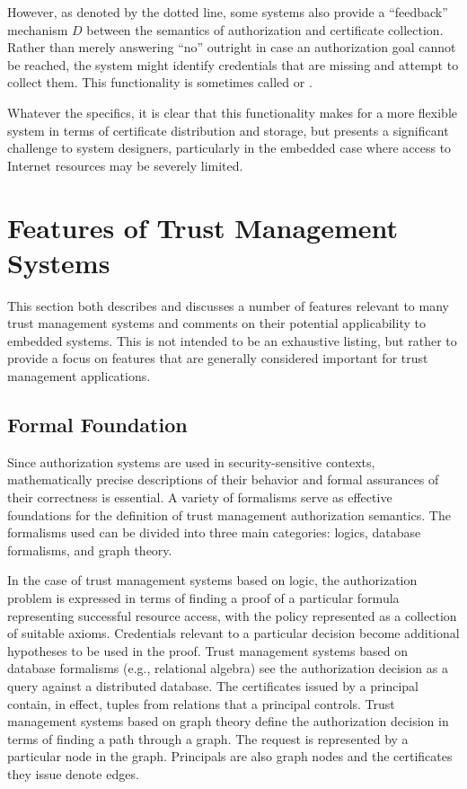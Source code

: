 However, as denoted by the dotted line, some systems also provide a ``feedback'' mechanism $D$
between the semantics of authorization and certificate collection. Rather than merely answering
``no'' outright in case an authorization goal cannot be reached, the system might identify
credentials that are missing and attempt to collect them. This functionality is sometimes called
 \cite{Li:DCDTM} or  \cite{Gunter:PDCR}.

Whatever the specifics, it is clear that this functionality makes for a more flexible system in
terms of certificate distribution and storage, but presents a significant challenge to system
designers, particularly in the embedded case where access to Internet resources may be severely
limited.

\section{Features of Trust Management Systems}
\label{section-features}

This section both describes and discusses a number of features relevant to many trust management
systems and comments on their potential applicability to embedded systems. This is not intended
to be an exhaustive listing, but rather to provide a focus on features that are generally considered
important for trust management applications.

\subsection{Formal Foundation}

Since authorization systems are used in security-sensitive contexts, mathematically precise
descriptions of their behavior and formal assurances of their correctness is essential. A
variety of formalisms serve as effective foundations for the definition of trust management
authorization semantics. The formalisms used can be divided into three main categories: logics,
database formalisms, and graph theory.

In the case of trust management systems based on logic, the authorization problem is expressed
in terms of finding a proof of a particular formula representing successful resource access,
with the policy represented as a collection of suitable axioms. Credentials relevant to a
particular decision become additional hypotheses to be used in the proof. Trust management
systems based on database formalisms (e.g., relational algebra) see the authorization decision
as a query against a distributed database. The certificates issued by a principal contain, in
effect, tuples from relations that a principal controls. Trust management systems based on graph
theory define the authorization decision in terms of finding a path through a graph. The request
is represented by a particular node in the graph. Principals are also graph nodes and the
certificates they issue denote edges.

